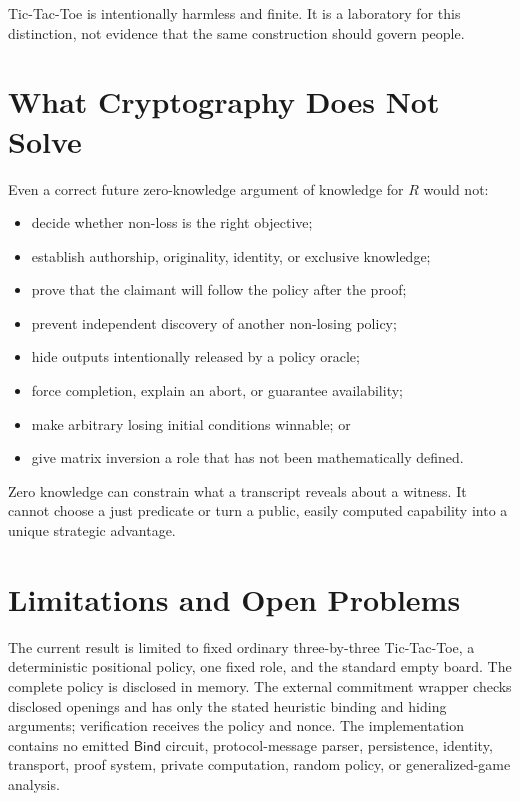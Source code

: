 Tic-Tac-Toe is intentionally harmless and finite. It is a laboratory for this
distinction, not evidence that the same construction should govern people.

\section{What Cryptography Does Not Solve}
\label{sec:ttt-cryptography-does-not-solve}

Even a correct future zero-knowledge argument of knowledge for $R$ would not:

\begin{itemize}
    \item decide whether non-loss is the right objective;
    \item establish authorship, originality, identity, or exclusive knowledge;
    \item prove that the claimant will follow the policy after the proof;
    \item prevent independent discovery of another non-losing policy;
    \item hide outputs intentionally released by a policy oracle;
    \item force completion, explain an abort, or guarantee availability;
    \item make arbitrary losing initial conditions winnable; or
    \item give matrix inversion a role that has not been mathematically defined.
\end{itemize}

Zero knowledge can constrain what a transcript reveals about a witness. It
cannot choose a just predicate or turn a public, easily computed capability
into a unique strategic advantage.

\section{Limitations and Open Problems}
\label{sec:ttt-limitations}

The current result is limited to fixed ordinary three-by-three Tic-Tac-Toe, a
deterministic positional policy, one fixed role, and the standard empty board.
The complete policy is disclosed in memory. The external commitment wrapper
checks disclosed openings and has only the stated heuristic binding and hiding
arguments; verification receives the policy and nonce. The implementation contains no emitted
\(\mathsf{Bind}\) circuit, protocol-message parser, persistence, identity,
transport, proof system, private computation, random policy, or
generalized-game analysis.

